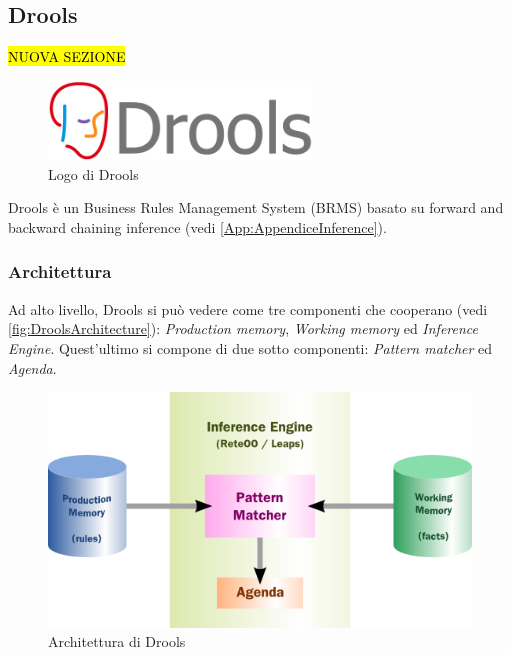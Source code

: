 \subsection{Drools}
	\hl{NUOVA SEZIONE}
	\begin{figure}[H]
		\begin{center}
			\includegraphics[width=7cm]{Pics/drools-logo.png}
			\caption{Logo di Drools}
			\label{fig:DroolsLogo}
		\end{center}
	\end{figure}
	Drools è un Business Rules Management System (BRMS) basato su forward and backward chaining inference (vedi \autoref{App:AppendiceInference}). 
	
	\subsubsection{Architettura}
	Ad alto livello, Drools si può vedere come tre componenti che cooperano (vedi  \autoref{fig:DroolsArchitecture}):\textit{ Production memory}, \textit{Working memory} ed \textit{Inference Engine}. Quest'ultimo si compone di due sotto componenti: \textit{Pattern matcher} ed \textit{Agenda}.
	\begin{figure}[H]
		\begin{center}
			\includegraphics[width=12cm]{Pics/drools_abstract_structure.png}
			\caption{Architettura di Drools}
			\label{fig:DroolsArchitecture}
		\end{center}
	\end{figure}
	
